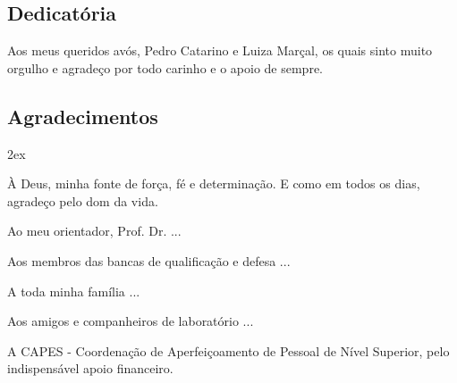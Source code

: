 \clearpage
\setcounter{page}{7}

\begin{center}
\chapter*{Dedicatória}
\end{center}
\vspace*{1cm}

Aos meus queridos avós, Pedro Catarino e Luiza Marçal, os quais sinto muito orgulho e agradeço por
todo carinho e o apoio de sempre.


\clearpage
\setcounter{page}{9}

\begin{center}
\chapter*{Agradecimentos}
\end{center}

\vspace*{1cm}
\begin{trivlist}  \itemsep 2ex  \normalsize

\item À Deus, minha fonte de força, fé e determinação. E como em todos os dias, agradeço pelo dom da
vida.

\item Ao meu orientador, Prof. Dr. ...

\item Aos membros das bancas de qualificação e defesa ...

\item A toda minha família ...

\item Aos amigos e companheiros de laboratório ...

\item A CAPES - Coordenação de Aperfeiçoamento de Pessoal de Nível Superior, pelo indispensável
apoio financeiro.

\end{trivlist}


